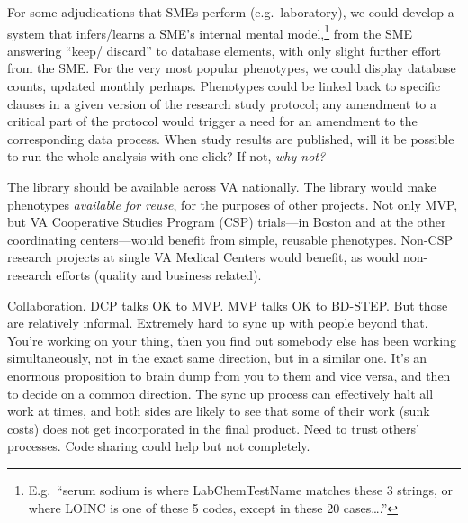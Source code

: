 \documentclass{tufte-handout}
\begin{document}
For some adjudications that SMEs perform (e.g.\ laboratory), we could
develop a system that infers\slash learns a SME's internal mental
model,\footnote{E.g.\ ``serum sodium is where LabChemTestName matches
  these 3 strings, or where LOINC is one of these 5 codes, except in
  these 20 cases\ldots{}.''} from the SME answering ``keep\slash
discard'' to database elements, with only slight further effort from
the SME. For the very most popular phenotypes, we could display
database counts, updated monthly perhaps. Phenotypes could be linked
back to specific clauses in a given version of the research study
protocol; any amendment to a critical part of the protocol would
trigger a need for an amendment to the corresponding data process.
When study results are published, will it be possible to run the whole
analysis with one click? If not, \emph{why not?}

The library should be available across VA nationally. The library
would make phenotypes \emph{available for reuse}, for the purposes of
other projects. Not only MVP, but VA Cooperative Studies Program (CSP)
trials---in Boston and at the other coordinating centers---would
benefit from simple, reusable phenotypes. Non-CSP research projects at
single VA Medical Centers would benefit, as would non-research efforts
(quality and business related).

Collaboration. DCP talks OK to MVP. MVP talks OK to BD-STEP. But those
are relatively informal. Extremely hard to sync up with people beyond
that. You're working on your thing, then you find out somebody else
has been working simultaneously, not in the exact same direction, but
in a similar one. It's an enormous proposition to brain dump from you
to them and vice versa, and then to decide on a common direction. The
sync up process can effectively halt all work at times, and both sides
are likely to see that some of their work (sunk costs) does not get
incorporated in the final product. Need to trust others' processes.
Code sharing could help but not completely.
\end{document}
